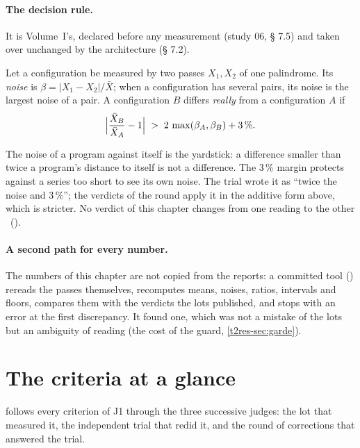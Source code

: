 \paragraph{The decision rule.} It is Volume~I's, declared before any measurement (study 06, § 7.5) and taken over unchanged by the architecture (§ 7.2).

\begin{definition}\label{t2res-def:reel}
Let a configuration be measured by two passes $X_1, X_2$ of one palindrome. Its \emph{noise} is $\beta = |X_1 - X_2| / \bar X$; when a configuration has several pairs, its noise is the largest noise of a pair. A configuration $B$ differs \emph{really} from a configuration $A$ if
\[
\Bigl|\frac{\bar X_B}{\bar X_A} - 1\Bigr| \;>\; 2\,\max(\beta_A, \beta_B) + 3\,\%.
\]
\end{definition}

The noise of a program against itself is the yardstick: a difference smaller than twice a program's distance to itself is not a difference. The 3\,\% margin protects against a series too short to see its own noise. The trial wrote it as ``twice the noise and 3\,\%''; the verdicts of the round apply it in the additive form above, which is stricter. No verdict of this chapter changes from one reading to the other \calc~().

\paragraph{A second path for every number.} The numbers of this chapter are not copied from the reports: a committed tool () rereads the passes themselves, recomputes means, noises, ratios, intervals and floors, compares them with the verdicts the lots published, and stops with an error at the first discrepancy. It found one, which was not a mistake of the lots but an ambiguity of reading (the cost of the guard, \cref{t2res-sec:garde}).

\section{The criteria at a glance}\label{t2res-sec:criteres}

 follows every criterion of J1 through the three successive judges: the lot that measured it, the independent trial that redid it, and the round of corrections that answered the trial.

